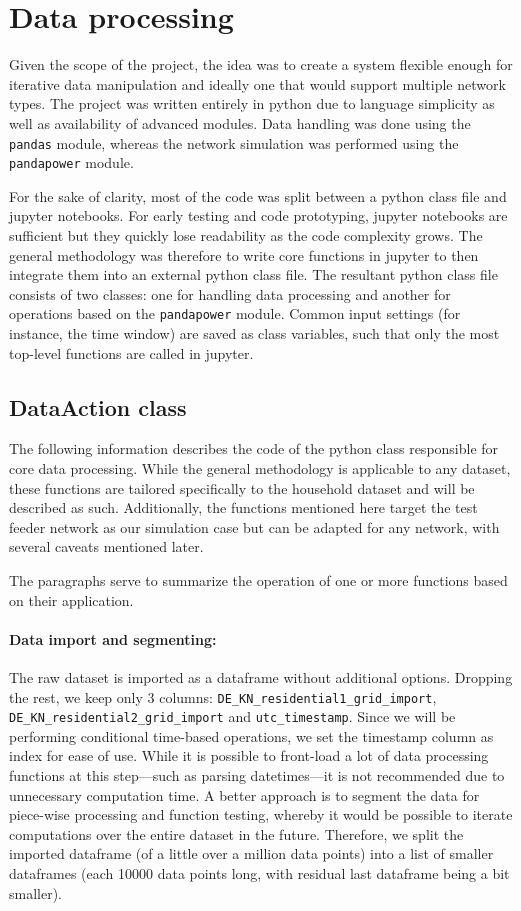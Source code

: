 \documentclass[a4paper,10pt]{report}
\begin{document}
\newpage
\section{Data processing}\label{section_data_processing}
Given the scope of the project, the idea was to create a system flexible enough for iterative data manipulation and ideally one that would support multiple network types. The project was written entirely in python due to language simplicity as well as availability of advanced modules. Data handling was done using the \texttt{pandas} module, whereas the network simulation was performed using the \texttt{pandapower} module.

For the sake of clarity, most of the code was split between a python class file and jupyter notebooks. For early testing and code prototyping, jupyter notebooks are sufficient but they quickly lose readability as the code complexity grows. The general methodology was therefore to write core functions in jupyter to then integrate them into an external python class file. The resultant python class file consists of two classes: one for handling data processing and another for operations based on the \texttt{pandapower} module. Common input settings (for instance, the time window) are saved as class variables, such that only the most top-level functions are called in jupyter.

\subsection{DataAction class}
The following information describes the code of the python class responsible for core data processing. While the general methodology is applicable to any dataset, these functions are tailored specifically to the household dataset and will be described as such. Additionally, the functions mentioned here target the test feeder network as our simulation case but can be adapted for any network, with several caveats mentioned later.

The paragraphs serve to summarize the operation of one or more functions based on their application.

\paragraph{Data import and segmenting:} The raw dataset is imported as a dataframe without additional options. Dropping the rest, we keep only 3 columns: \texttt{DE\_KN\_residential1\_grid\_import}, \texttt{DE\_KN\_residential2\_grid\_import} and \texttt{utc\_timestamp}. Since we will be performing conditional time-based operations, we set the timestamp column as index for ease of use. While it is possible to front-load a lot of data processing functions at this step---such as parsing datetimes---it is not recommended due to unnecessary computation time. A better approach is to segment the data for piece-wise processing and function testing, whereby it would be possible to iterate computations over the entire dataset in the future. Therefore, we split the imported dataframe (of a little over a million data points) into a list of smaller dataframes (each 10000 data points long, with residual last dataframe being a bit smaller).
\end{document}
